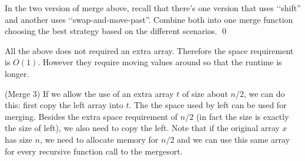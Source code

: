 \begin{ex}
In the two version of merge above, 
recall that there's one version that uses \lq\lq shift''
and another uses \lq\lq swap-and-move-past''.
Combine both into one merge function choosing the best
strategy based on the different scenarios.
\qed
\end{ex}

All the above does not required an extra array.
Therefore the space requirement is $O(1)$.
However they require moving values around so that 
the runtime is longer.

\begin{ex} (Merge 3)
If we allow the use of an extra array $t$ of size about $n/2$, we
can do this:
first copy the left array into $t$.
The the space used by left can be used for merging.
Besides the extra space requirement of $n/2$ (in fact the size is
exactly the size of left), 
we also need to copy the left.
Note that if the original array $x$ has size $n$,
we need to allocate memory for $n/2$ and we can use this same array
for every recursive function call to the mergesort.
\end{ex}
